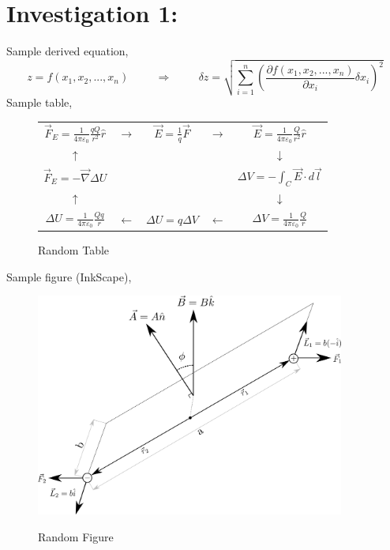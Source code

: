 \documentclass[12pt,a4paper]{article}
\begin{document}
	\section*{Investigation 1:}	
		Sample derived equation,
		\[ z = f(x_1,x_2,...,x_n) 
		\hspace{1cm} \Rightarrow \hspace{1cm}
		\delta z = \sqrt{\sum_{i=1}^n \left(
		\frac{\partial f(x_1,x_2,...,x_n)}{\partial x_i} \delta x_i \right)^2 }\]
		Sample table,
		\begin{figure}[H]
			\centering
			\begin{tabular}{ccccc}
				\(\displaystyle \vec{F}_E = \frac{1}{4 \pi \varepsilon_0} \frac{qQ}{r^2} \hat{r} \) &
				$\rightarrow$ & 
				$\displaystyle \vec{E} = \frac{1}{q} \vec{F}$ & 
				$\rightarrow$ &
				\(\displaystyle \vec{E} = \frac{1}{4 \pi \varepsilon_0} \frac{Q}{r^2} \hat{r} \)\\
				$\uparrow$ & & & & $\downarrow$\\
				\(\displaystyle \vec{F}_E = - \vec{\nabla} \Delta U\) & & & &
				\(\displaystyle \Delta V = - \int_C \vec{E} \cdot d\vec{l}\)\\
				$\uparrow$ & & & & $\downarrow$\\
				\(\displaystyle \Delta U = \frac{1}{4 \pi \varepsilon_0} \frac{Qq}{r} \) &
				$\leftarrow$ & 
				$\Delta U = q \Delta V$ & 
				$\leftarrow$ &
				\(\displaystyle \Delta V = \frac{1}{4 \pi \varepsilon_0} \frac{Q}{r} \)
			\end{tabular}
			\caption{Random Table}
		\end{figure} \noindent
		Sample figure (InkScape),
		\begin{figure}[H]
			\centering
			\includegraphics[width=4in]{RandFigure}\\
			\caption{Random Figure}
		\end{figure} \noindent
\end{document}
